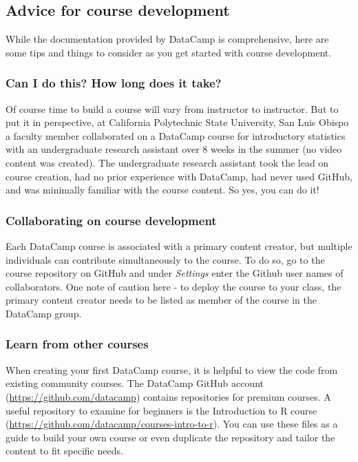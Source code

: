 \documentclass{tise_style_doi}
\begin{document}
\subsection{Advice for course development}

While the documentation provided by DataCamp is comprehensive, here are some tips
and things to consider as you get started with course development.

\subsubsection{Can I do this? How long does it take?}

Of course time to build a course will vary from instructor to instructor.  But to
put it in perspective, at California Polytechnic State University, San Luis Obispo a faculty
member collaborated on a DataCamp course for introductory statistics with an
undergraduate research assistant over 8 weeks in the summer (no video content
was created).  The undergraduate research assistant took the lead on course creation,
had no prior experience with DataCamp, had never used GitHub, and was minimally
familiar with the course content. So yes, you can do it!

\subsubsection{Collaborating on course development}

Each DataCamp course is associated with a primary content creator, but multiple individuals
can contribute simultaneously to the course.  To do so, go to the course repository on GitHub
and under \textit{Settings} enter the Github user names of collaborators. One note of caution
here - to deploy the course to your class, the primary content creator needs to be listed
as member of the course in the DataCamp group.

\subsubsection{Learn from other courses}

When creating your first DataCamp course, it is helpful to view the code from existing
community courses. The DataCamp GitHub account (\url{https://github.com/datacamp})
contains repositories for premium courses.  A useful repository to examine for
beginners is the Introduction to R course (\url{https://github.com/datacamp/courses-intro-to-r}).
You can use these files as a guide to build your own course or even duplicate the repository
and tailor the content to fit specific needs.
\end{document}
